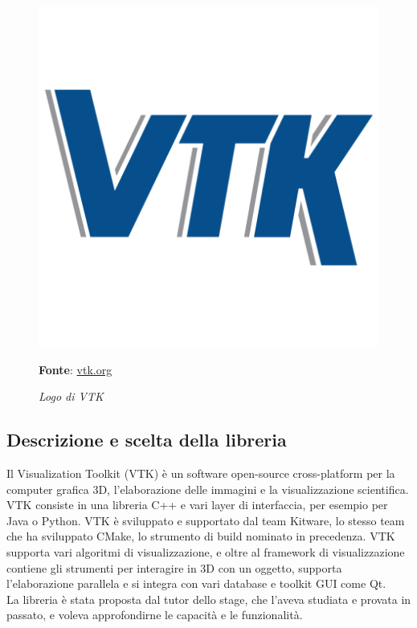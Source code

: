 \begin{figure}[h]
    \centering
    \includegraphics[scale=0.1]{immagini/volumerendering/VTK_logo.png}
    \caption{\textit{Logo di VTK}}
    \textbf{Fonte}: \href{https://vtk.org/}{vtk.org}
    \label{fig: Logo VTK}
\end{figure}

\subsection{Descrizione e scelta della libreria}\label{sec:scelta-liberia}
Il Visualization Toolkit (VTK) è un software open-source cross-platform per la computer grafica 3D, l'elaborazione delle immagini e la visualizzazione scientifica. VTK consiste in una libreria C++ e vari layer di interfaccia, per esempio per Java o Python. VTK è sviluppato e supportato dal team Kitware, lo stesso team che ha sviluppato CMake, lo strumento di build nominato in precedenza. VTK supporta vari algoritmi di visualizzazione, e oltre al framework di visualizzazione contiene gli strumenti per interagire in 3D con un oggetto, supporta l'elaborazione parallela e si integra con vari database e toolkit GUI come Qt.\\
La libreria è stata proposta dal tutor dello stage, che l'aveva studiata e provata in passato, e voleva approfondirne le capacità e le funzionalità.

